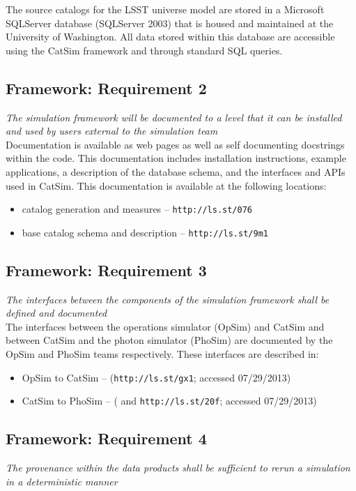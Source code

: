 \documentclass[11pt]{article}
\begin{document}
The source catalogs for the LSST universe model are stored in a
Microsoft SQLServer database (SQLServer 2003) that is housed and
maintained at the University of Washington. All data stored within
this database are accessible using the CatSim framework and through
standard SQL queries.

\subsection{Framework: Requirement 2}

{\it The simulation framework will be documented to a level
  that it can be installed and used by users external to the
  simulation team}\\

Documentation is available as web pages as well as self documenting
docstrings within the code.  This documentation includes installation
instructions, example applications, a description of the database
schema, and the interfaces and APIs used in CatSim. This documentation
is available at the following locations:
\begin{itemize}
\item catalog generation and measures -- {\tt http://ls.st/076}

\item base catalog schema and description -- {\tt http://ls.st/9m1}
\end{itemize}


\subsection{Framework: Requirement 3}

{\it  The interfaces between the components of the simulation framework shall be defined 
and documented}\\

The interfaces between the operations simulator (OpSim) and CatSim and
between CatSim and the photon simulator (PhoSim) are documented by the
OpSim and PhoSim teams respectively.  These interfaces are described in:
\begin{itemize}
\item OpSim to CatSim -- ({\tt http://ls.st/gx1}; accessed 07/29/2013)
\item CatSim to PhoSim -- (\citet{phosim} and {\tt http://ls.st/20f}; accessed 07/29/2013)
\end{itemize}

\subsection{Framework: Requirement 4} 
\label{sec:determine}
{\it The provenance within the data products shall be sufficient to rerun a simulation in a 
deterministic manner}\\
\end{document}
